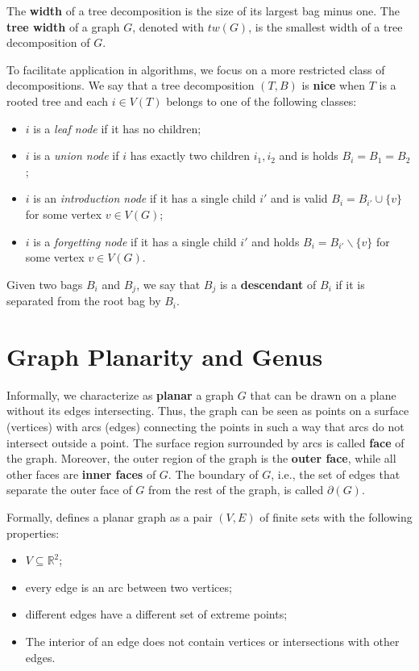 The \textbf{width} of a tree decomposition is the size of its largest bag minus one. The \textbf{tree width} of a graph \(G\), denoted with \(tw(G)\), is the smallest width of a tree decomposition of \(G\).

To facilitate application in algorithms, we focus on a more restricted class of decompositions. We say that a tree decomposition \((T, B)\) is \textbf{nice} when \(T\) is a rooted tree and each \(i \in V(T)\) belongs to one of the following classes:

\begin{itemize}
    \item \(i\) is a \textit{leaf node} if it has no children;
    \item \(i\) is a \textit{union node} if \(i\) has exactly two children \(i_1, i_2\) and is holds \(B_i = B_1 = B_2\);
    \item \(i\) is an \textit{introduction node} if it has a single child \(i'\) and is valid \(B_i = B_{i'} \cup \{v\}\) for some vertex \(v \in V(G)\);
    \item \(i\) is a \textit{forgetting node} if it has a single child \(i'\) and holds \(B_i = B_{i'} \backslash \{v\}\) for some vertex \(v \in V(G)\).
\end{itemize}

Given two bags \(B_i\) and \(B_j\), we say that \(B_j\) is a \textbf{descendant} of \(B_i\) if it is separated from the root bag by \(B_i\).

\section{Graph Planarity and Genus}

Informally, we characterize as \textbf{planar} a graph \(G\) that can be drawn on a plane without its edges intersecting. Thus, the graph can be seen as points on a surface (vertices) with arcs (edges) connecting the points in such a way that arcs do not intersect outside a point. The surface region surrounded by arcs is called \textbf{face} of the graph. Moreover, the outer region of the graph is the \textbf{outer face}, while all other faces are \textbf{inner faces} of \(G\). The boundary of \(G\), i.e., the set of edges that separate the outer face of \(G\) from the rest of the graph, is called \(\partial(G)\).

Formally, \cite{Diestel} defines a planar graph as a pair \((V, E)\) of finite sets with the following properties:

\begin{itemize}
    \item \(V \subseteq \mathbb{R}^2\);
    \item every edge is an arc between two vertices;
    \item different edges have a different set of extreme points;
    \item The interior of an edge does not contain vertices or intersections with other edges.
\end{itemize}

